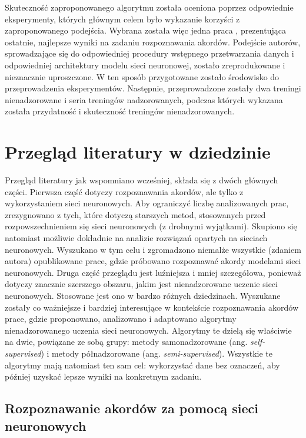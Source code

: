 Skuteczność zaproponowanego algorytmu została oceniona poprzez odpowiednie eksperymenty, których głównym celem było wykazanie korzyści z zaproponowanego podejścia. Wybrana została więc jedna praca \cite{park_bi-directional_2019}, prezentująca ostatnie, najlepsze wyniki na zadaniu rozpoznawania akordów. Podejście autorów, sprowadzające się do odpowiedniej procedury wstępnego przetwarzania danych i odpowiedniej architektury modelu sieci neuronowej, zostało zreprodukowane i nieznacznie uproszczone. W ten sposób przygotowane zostało środowisko do przeprowadzenia eksperymentów. Następnie, przeprowadzone zostały dwa treningi nienadzorowane i seria treningów nadzorowanych, podczas których wykazana została przydatność i skuteczność treningów nienadzorowanych.



\section{Przegląd literatury w dziedzinie}

Przegląd literatury jak wspomniano wcześniej, składa się z dwóch głównych części. Pierwsza część dotyczy rozpoznawania akordów, ale tylko z wykorzystaniem sieci neuronowych. Aby ograniczyć liczbę analizowanych prac, zrezygnowano z tych, które dotyczą starszych metod, stosowanych przed rozpowszechnieniem się sieci neuronowych (z drobnymi wyjątkami). Skupiono się natomiast możliwie dokładnie na analizie rozwiązań opartych na sieciach neuronowych. Wyszukano w tym celu i zgromadzono niemalże wszystkie (zdaniem autora) opublikowane prace, gdzie próbowano rozpoznawać akordy modelami sieci neuronowych. Druga część przeglądu jest luźniejsza i mniej szczegółowa, ponieważ dotyczy znacznie szerszego obszaru, jakim jest nienadzorowane uczenie sieci neuronowych. Stosowane jest ono w bardzo różnych dziedzinach. Wyszukane zostały co ważniejsze i bardziej interesujące w kontekście rozpoznawania akordów prace, gdzie proponowano, analizowano i adaptowano algorytmy nienadzorowanego uczenia sieci neuronowych. Algorytmy te dzielą się właściwie na dwie, powiązane ze sobą grupy: metody samonadzorowane (ang. \emph{self-supervised}) i metody półnadzorowane (ang. \emph{semi-supervised}). Wszystkie te algorytmy mają natomiast ten sam cel: wykorzystać dane bez oznaczeń, aby później uzyskać lepsze wyniki na konkretnym zadaniu.

\subsection{Rozpoznawanie akordów za pomocą sieci neuronowych}

